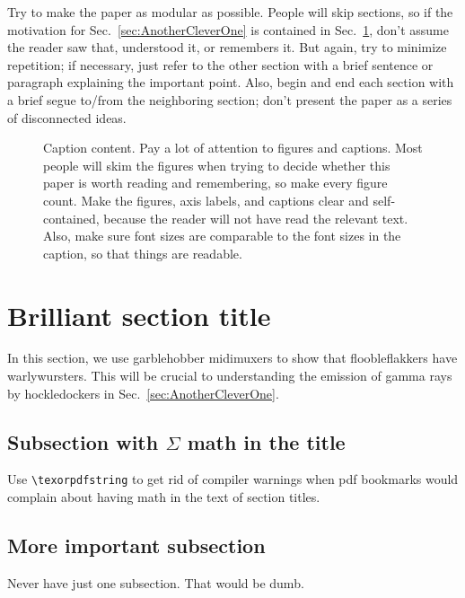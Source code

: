 \documentclass[reprint, aps, prd, letterpaper, noshowpacs, amsmath, %
amssymb, amsfonts, nofootinbib, floatfix, superscriptaddress, %
twoside]{revtex4-1}
\begin{document}
Try to make the paper as modular as possible.  People will skip
sections, so if the motivation for Sec.~\ref{sec:AnotherCleverOne} is
contained in Sec.~\ref{sec:BrilliantSection}, don't assume the reader
saw that, understood it, or remembers it.  But again, try to minimize
repetition; if necessary, just refer to the other section with a brief
sentence or paragraph explaining the important point.  Also, begin and
end each section with a brief segue to/from the neighboring section;
don't present the paper as a series of disconnected ideas.


\begin{figure}
  \caption{ \label{fig:SomeFigure} %
     Caption content. Pay a lot of attention to
    figures and captions.  Most people will skim the figures when
    trying to decide whether this paper is worth reading and
    remembering, so make every figure count.  Make the figures, axis
    labels, and captions clear and self-contained, because the reader
    will not have read the relevant text.  Also, make sure font sizes
    are comparable to the font sizes in the caption, so that things
    are readable. %
  }
\end{figure}


\section{Brilliant section title}
\label{sec:BrilliantSection}
In this section, we use garblehobber midimuxers to show that
floobleflakkers have warlywursters.  This will be crucial to
understanding the emission of gamma rays by hockledockers in
Sec.~\ref{sec:AnotherCleverOne}.

\subsection{Subsection with \texorpdfstring{$\Sigma$}{Sigma}
  math in the title}
\label{sec:ImportantSubsection}

Use \verb|\texorpdfstring| to get rid of compiler warnings when pdf
bookmarks would complain about having math in the text of section
titles.

\subsection{More important subsection}
\label{sec:MoreImportantSubsection}
Never have just one subsection.  That would be dumb.
\end{document}
